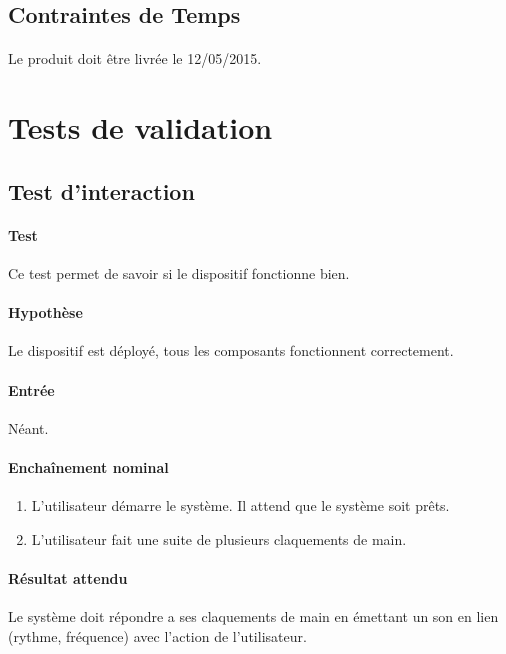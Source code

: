 \documentclass[a4paper, titlepage, oneside, 12pt]{article}%
\begin{document}
\subsection{Contraintes de Temps}
\paragraph{}
Le produit doit être livrée le 12/05/2015.

\section{Tests de validation}

\subsection{Test d'interaction}
\paragraph{Test\\}
Ce test permet de savoir si le dispositif fonctionne bien.

\paragraph{Hypothèse\\}
Le dispositif est déployé, tous les composants fonctionnent correctement.

\paragraph{Entrée\\}
Néant.

\paragraph{Enchaînement nominal}
\begin {enumerate}
\item L'utilisateur démarre le système. Il attend que le système soit prêts.
\item L'utilisateur fait une suite de plusieurs claquements de main.
\end{enumerate}

\paragraph{Résultat attendu\\}
Le système doit répondre a ses claquements de main en émettant un son en lien (rythme, fréquence) avec l'action de l'utilisateur.
\end{document}
